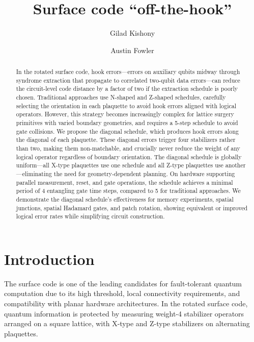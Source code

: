 \documentclass[twocolumn,
aps,
prx,
showpacs,
amsmath,
amssymb,
floatfix,
longbibliography,
superscriptaddress,
eprint]
{revtex4-1}
\begin{document}
\title{Surface code ``off-the-hook''}
    
\author{Gilad Kishony}
\author{Austin Fowler}

\begin{abstract}
In the rotated surface code, hook errors---errors on auxiliary qubits midway through syndrome extraction that propagate to correlated two-qubit data errors---can reduce the circuit-level code distance by a factor of two if the extraction schedule is poorly chosen.
Traditional approaches use N-shaped and Z-shaped schedules, carefully selecting the orientation in each plaquette to avoid hook errors aligned with logical operators.
However, this strategy becomes increasingly complex for lattice surgery primitives with varied boundary geometries, and requires a 5-step schedule to avoid gate collisions.
We propose the diagonal schedule, which produces hook errors along the diagonal of each plaquette.
These diagonal errors trigger four stabilizers rather than two, making them non-matchable, and crucially never reduce the weight of any logical operator regardless of boundary orientation.
The diagonal schedule is globally uniform---all X-type plaquettes use one schedule and all Z-type plaquettes use another---eliminating the need for geometry-dependent planning.
On hardware supporting parallel measurement, reset, and gate operations, the schedule achieves a minimal period of 4 entangling gate time steps, compared to 5 for traditional approaches.
We demonstrate the diagonal schedule's effectiveness for memory experiments, spatial junctions, spatial Hadamard gates, and patch rotation, showing equivalent or improved logical error rates while simplifying circuit construction.
\end{abstract}
   
    
\maketitle

\section{Introduction}
\label{sec:intro}

The surface code is one of the leading candidates for fault-tolerant quantum computation due to its high threshold, local connectivity requirements, and compatibility with planar hardware architectures.
In the rotated surface code, quantum information is protected by measuring weight-4 stabilizer operators arranged on a square lattice, with X-type and Z-type stabilizers on alternating plaquettes.
\end{document}
